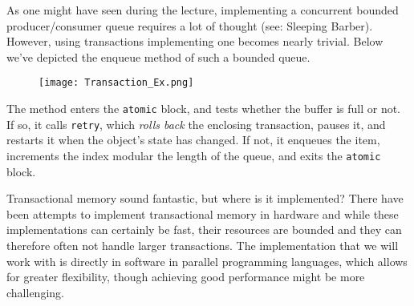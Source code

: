 \documentclass[main]{subfiles}
\begin{document}
\begin{example}
    As one might have seen during the lecture, implementing a concurrent bounded producer/consumer queue requires a lot of thought (see: Sleeping Barber). However, using transactions implementing one becomes nearly trivial. Below we've depicted the enqueue method of such a bounded queue.
    \begin{figure}[H]
        \centering
        \texttt{[image: Transaction\_Ex.png]}
    \end{figure}
    The method enters the \texttt{atomic} block, and tests whether the buffer is full or not. If so, it calls \texttt{retry}, which \textit{rolls back} the enclosing transaction, pauses it, and restarts it when the object's state has changed. If not, it enqueues the item, increments the index modular the length of the queue, and exits the \texttt{atomic} block.
\end{example}
Transactional memory sound fantastic, but where is it implemented? There have been attempts to implement transactional memory in hardware and while these implementations can certainly be fast, their resources are bounded and they can therefore often not handle larger transactions. The implementation that we will work with is directly in software in parallel programming languages, which allows for greater flexibility, though achieving good performance might be more challenging.
\end{document}
